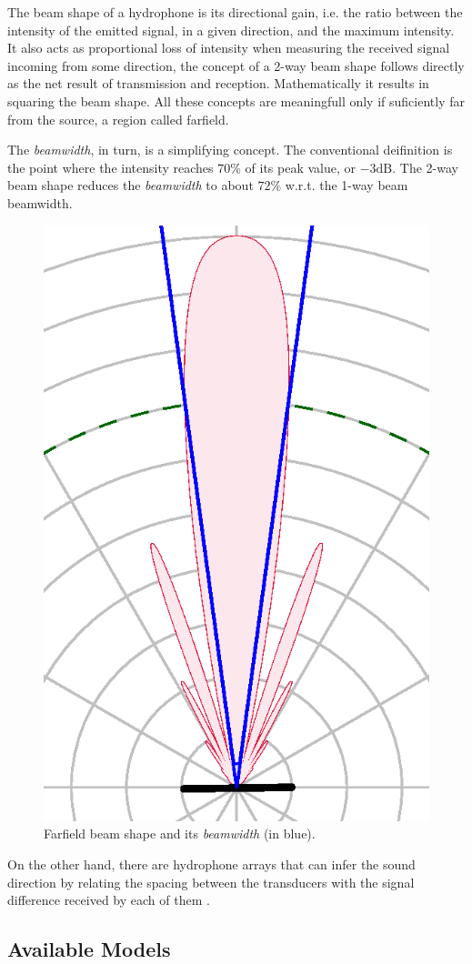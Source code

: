 The beam shape of a hydrophone is its directional gain, i.e. the ratio between
the intensity of the emitted signal, in a given direction, and the maximum
intensity. It also acts as proportional loss of intensity when measuring the
received signal incoming from some direction, the concept of a 2-way beam
shape follows directly as the net result of transmission and reception.
Mathematically it results in squaring the beam shape. All these concepts are
meaningfull only if suficiently far from the source, a region called
farfield\cite{beamwidth}.

The \textit{beamwidth}, in turn, is a simplifying concept. The conventional
deifinition is the point where the intensity reaches $70\%$ of its peak value,
or $-3\text{dB}$. The 2-way beam shape reduces the \textit{beamwidth} to about
$72\%$ w.r.t. the 1-way beam beamwidth.

\begin{figure}[h]
	\centering
	\includegraphics[scale=0.6,trim={0.46 0.072 0.46
	1.03},clip]{Chap2/fig/directivity.eps}
	\caption{Farfield beam shape and its \textit{beamwidth} (in blue).}
	\label{fig:beamwidth}
\end{figure}

On the other hand, there are hydrophone arrays that can infer the sound
direction by relating the spacing between the transducers with the signal
difference received by each of them \cite{bearing}.




\subsection{Available Models}
\label{ss:avaible_models}
 
\cite{sonars:16} %
